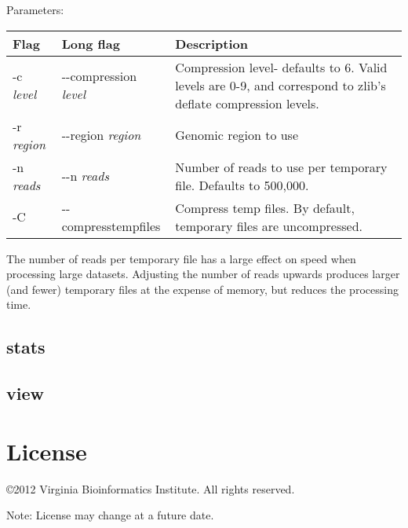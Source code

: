 \documentclass[11pt]{article}
\begin{document}
Parameters:
\begin{center}
\begin{tabular}{llp{3.5in}}
\hline
Flag&Long flag&Description\\ \hline
-c \textit{level}&{-}{-}compression \textit{level}&Compression level- defaults to 6. Valid levels are 0-9, and correspond to zlib's deflate compression levels. \\
-r \textit{region}&{-}{-}region \textit{region}&Genomic region to use\\
-n \textit{reads}&{-}{-}n \textit{reads}&Number of reads to use per temporary file. Defaults to 500,000.\\
-C&{-}{-}compresstempfiles&Compress temp files. By default, temporary files are uncompressed.\\
\end{tabular}
\end{center}

The number of reads per temporary file has a large effect on speed when processing large datasets. Adjusting the number of reads upwards produces larger (and fewer) temporary files at the expense of memory, but reduces the processing time.

\subsection{stats}
\subsection{view}

\section {License}
\copyright 2012 Virginia Bioinformatics Institute. All rights reserved.

Note: License may change at a future date.
\end{document}
